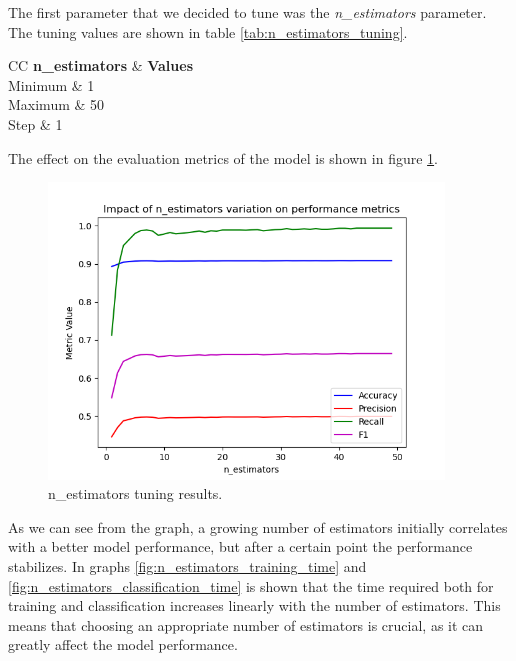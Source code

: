 \documentclass[futureinternet,article,submit,pdftex,moreauthors]{Definitions/mdpi}
\begin{document}
The first parameter that we decided to tune was the \textit{n\_estimators} parameter. The tuning values are shown in table \ref{tab:n_estimators_tuning}.

\begin{table}[H]
	\caption{n\_estimators tuning values.}\label{tab:n_estimators_tuning}
	\begin{tabularx}{\textwidth}{CC}
	\toprule
	\textbf{n\_estimators} & \textbf{Values} \\
	\midrule
	Minimum & 1 \\
	Maximum & 50 \\
	Step & 1 \\
	\bottomrule
\end{tabularx}
\end{table}

The effect on the evaluation metrics of the model is shown in figure \ref{fig:n_estimators_tuning}.

\begin{figure}[H]
	\includegraphics[width=10.5cm]{img/nEstimatorsTuning.png}
	\caption{n\_estimators tuning results.}\label{fig:n_estimators_tuning}
\end{figure}
\unskip

As we can see from the graph, a growing number of estimators initially correlates with a better model performance, but after a certain point the performance stabilizes. 
In graphs \ref{fig:n_estimators_training_time} and \ref{fig:n_estimators_classification_time} is shown that the time required both for training and classification increases linearly with the number of estimators.
This means that choosing an appropriate number of estimators is crucial, as it can greatly affect the model performance. 
\end{document}
